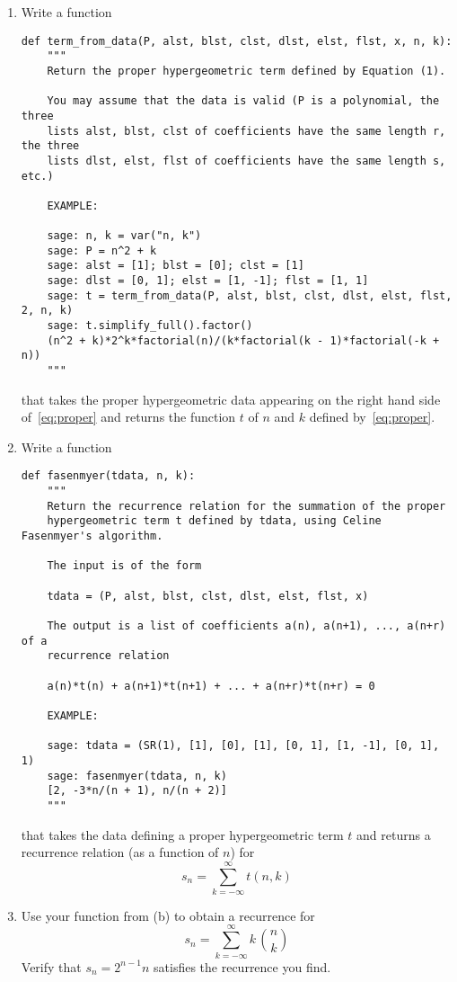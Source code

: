 \documentclass[12pt]{scrartcl}
\begin{document}
  \begin{enumerate}

    \item Write a function
  \begin{lstlisting}
def term_from_data(P, alst, blst, clst, dlst, elst, flst, x, n, k):
    """
    Return the proper hypergeometric term defined by Equation (1).

    You may assume that the data is valid (P is a polynomial, the three
    lists alst, blst, clst of coefficients have the same length r, the three
    lists dlst, elst, flst of coefficients have the same length s, etc.)

    EXAMPLE:

    sage: n, k = var("n, k")
    sage: P = n^2 + k
    sage: alst = [1]; blst = [0]; clst = [1]
    sage: dlst = [0, 1]; elst = [1, -1]; flst = [1, 1]
    sage: t = term_from_data(P, alst, blst, clst, dlst, elst, flst, 2, n, k)
    sage: t.simplify_full().factor()
    (n^2 + k)*2^k*factorial(n)/(k*factorial(k - 1)*factorial(-k + n))
    """
  \end{lstlisting}
  that takes the proper hypergeometric data appearing on the right hand side of~\eqref{eq:proper} and returns the function $t$ of $n$ and $k$ defined by~\eqref{eq:proper}.


\item Write a function
  \begin{lstlisting}
def fasenmyer(tdata, n, k):
    """
    Return the recurrence relation for the summation of the proper
    hypergeometric term t defined by tdata, using Celine Fasenmyer's algorithm.

    The input is of the form

    tdata = (P, alst, blst, clst, dlst, elst, flst, x)

    The output is a list of coefficients a(n), a(n+1), ..., a(n+r) of a
    recurrence relation

    a(n)*t(n) + a(n+1)*t(n+1) + ... + a(n+r)*t(n+r) = 0

    EXAMPLE:

    sage: tdata = (SR(1), [1], [0], [1], [0, 1], [1, -1], [0, 1], 1)
    sage: fasenmyer(tdata, n, k)
    [2, -3*n/(n + 1), n/(n + 2)]
    """
  \end{lstlisting}
  that takes the data defining a proper hypergeometric term $t$ and returns a recurrence relation (as a function of $n$) for
  \begin{equation*}
    s_n = \sum_{k=-\infty}^\infty t(n, k)
  \end{equation*}


\item Use your function from (b) to obtain a recurrence for
  \begin{equation*}
    s_n = \sum_{k=-\infty}^\infty k\,\binom{n}{k}
  \end{equation*}
  Verify that $s_n=2^{n-1}n$ satisfies the recurrence you find.

  \end{enumerate}
\end{document}
